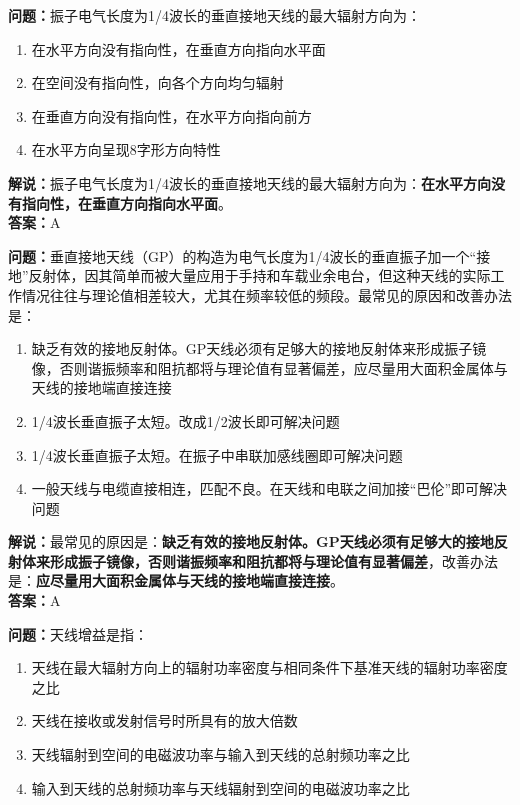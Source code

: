 \textbf{问题：}振子电气长度为1/4波长的垂直接地天线的最大辐射方向为：

\begin{enumerate}[label=\Alph*), leftmargin=1.5cm]
	\item 在水平方向没有指向性，在垂直方向指向水平面
	\item 在空间没有指向性，向各个方向均匀辐射
	\item 在垂直方向没有指向性，在水平方向指向前方
	\item 在水平方向呈现8字形方向特性
\end{enumerate}

\textbf{解说：}振子电气长度为1/4波长的垂直接地天线的最大辐射方向为：\textbf{在水平方向没有指向性，在垂直方向指向水平面}。\\\textbf{答案：}A%



\textbf{问题：}垂直接地天线（GP）的构造为电气长度为1/4波长的垂直振子加一个“接地”反射体，因其简单而被大量应用于手持和车载业余电台，但这种天线的实际工作情况往往与理论值相差较大，尤其在频率较低的频段。最常见的原因和改善办法是：

\begin{enumerate}[label=\Alph*), leftmargin=1.5cm]
	\item 缺乏有效的接地反射体。GP天线必须有足够大的接地反射体来形成振子镜像，否则谐振频率和阻抗都将与理论值有显著偏差，应尽量用大面积金属体与天线的接地端直接连接
	\item 1/4波长垂直振子太短。改成1/2波长即可解决问题
	\item 1/4波长垂直振子太短。在振子中串联加感线圈即可解决问题
	\item 一般天线与电缆直接相连，匹配不良。在天线和电联之间加接“巴伦”即可解决问题
\end{enumerate}

\textbf{解说：}最常见的原因是：\textbf{缺乏有效的接地反射体。GP天线必须有足够大的接地反射体来形成振子镜像，否则谐振频率和阻抗都将与理论值有显著偏差}，改善办法是：\textbf{应尽量用大面积金属体与天线的接地端直接连接}。\\\textbf{答案：}A



\textbf{问题：}天线增益是指：

\begin{enumerate}[label=\Alph*), leftmargin=1.5cm]
	\item 天线在最大辐射方向上的辐射功率密度与相同条件下基准天线的辐射功率密度之比
	\item 天线在接收或发射信号时所具有的放大倍数
	\item 天线辐射到空间的电磁波功率与输入到天线的总射频功率之比
	\item 输入到天线的总射频功率与天线辐射到空间的电磁波功率之比
\end{enumerate}

